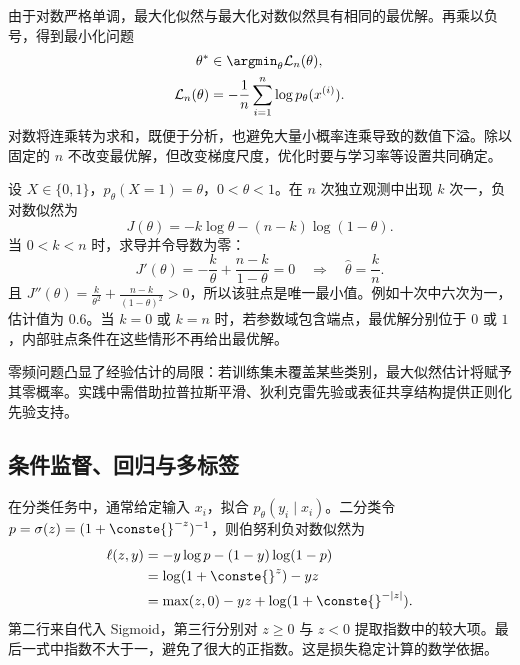 \documentclass[../textbook.tex]{subfiles}
\begin{document}
由于对数严格单调，最大化似然与最大化对数似然具有相同的最优解。再乘以负号，得到最小化问题
\begin{equation}
\begin{aligned}
 \theta^* &\in \argmin_\theta \mathcal L_n(\theta), \\
 \mathcal L_n(\theta) &= -\frac1n\sum_{i=1}^n\log p_\theta(x^{(i)}).
\end{aligned}
\end{equation}
对数将连乘转为求和，既便于分析，也避免大量小概率连乘导致的数值下溢。除以固定的 $n$ 不改变最优解，但改变梯度尺度，优化时要与学习率等设置共同确定。

\begin{example}[伯努利参数估计]
设 $X\in\{0,1\}$，$p_\theta(X=1)=\theta$，$0<\theta<1$。在 $n$ 次独立观测中出现 $k$ 次一，负对数似然为
\begin{equation*}
 J(\theta)=-k\log\theta-(n-k)\log(1-\theta).
\end{equation*}
当 $0<k<n$ 时，求导并令导数为零：
\begin{equation*}
 J'(\theta)=-\frac{k}{\theta}+\frac{n-k}{1-\theta}=0
 \quad\Longrightarrow\quad \widehat\theta=\frac{k}{n}.
\end{equation*}
且 $J''(\theta)=\frac{k}{\theta^2}+\frac{n-k}{(1-\theta)^2}>0$，所以该驻点是唯一最小值。例如十次中六次为一，估计值为 $0.6$。当 $k=0$ 或 $k=n$ 时，若参数域包含端点，最优解分别位于 $0$ 或 $1$，内部驻点条件在这些情形不再给出最优解。

零频问题凸显了经验估计的局限：若训练集未覆盖某些类别，最大似然估计将赋予其零概率。实践中需借助拉普拉斯平滑、狄利克雷先验或表征共享结构提供正则化先验支持。
\end{example}

\subsection{条件监督、回归与多标签}
在分类任务中，通常给定输入 $x_i$，拟合 $p_\theta(y_i\mid x_i)$。二分类令 $p=\sigma(z)=(1+\conste{}^{-z})^{-1}$，则伯努利负对数似然为
\begin{align}
 \ell(z,y)&=-y\log p-(1-y)\log(1-p)\\
 &=\log(1+\conste{}^z)-yz\\
 &=\max(z,0)-yz+\log(1+\conste{}^{-|z|}).\label{eq:stable-bce}
\end{align}
第二行来自代入 Sigmoid，第三行分别对 $z\ge0$ 与 $z<0$ 提取指数中的较大项。最后一式中指数不大于一，避免了很大的正指数。这是损失稳定计算的数学依据。
\end{document}
